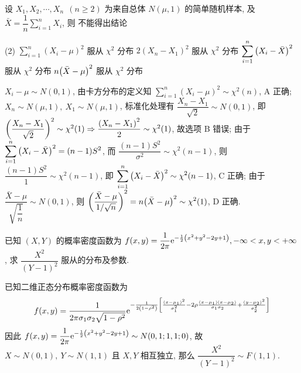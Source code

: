 \begin{example}
    设 $X_1,X_2,\cdots,X_n~~(n\geqslant 2)$ 为来自总体 $N(\mu,1)$ 的简单随机样本, 及 $\bar{X}=\dfrac{1}{n}\displaystyle\sum_{i=1}^{n}X_i$, 则 不能得出结论
    \begin{tasks}(2)
        \task $\displaystyle \sum_{i=1}^{n}(X_i-\mu)^2$ 服从 $\chi^2$ 分布
        \task $\displaystyle 2(X_n-X_1)^2$ 服从 $\chi^2$ 分布
        \task $\displaystyle \sum_{i=1}^{n}\qty(X_i-\bar{X})^2$ 服从 $\chi^2$ 分布
        \task $\displaystyle n\qty(\bar{X}-\mu)^2$ 服从 $\chi^2$ 分布
    \end{tasks}
\end{example}
\begin{solution}
    $X_i-\mu\sim N(0,1)$, 由卡方分布的定义知 $\displaystyle\sum_{i=1}^{n}(X_i-\mu)^2\sim \chi^2(n)$, A 正确;
    $X_n\sim N(\mu,1),~X_1\sim N(\mu,1)$, 标准化处理有 $\dfrac{X_n-X_1}{\sqrt{2}}\sim N(0,1)$, 即 $\qty(\dfrac{X_n-X_1}{\sqrt{2}})^2\sim \chi^2(1)\Rightarrow \dfrac{\qty(X_n-X_1)^2}{2}\sim \chi^2(1)$, 故选项 B 错误;
    由于 $\displaystyle \sum_{i=1}^{n}\qty(X_i-\bar{X})^2=(n-1)S^2$, 而 $\dfrac{(n-1)S^2}{\sigma^2}\sim \chi^2(n-1)$, 则 $\dfrac{(n-1)S^2}{1}\sim \chi^2(n-1)$, 即 $\displaystyle \sum_{i=1}^{n}\qty(X_i-\bar{X})^2\sim \chi^2(n-1)$, C 正确;
    由于 $\dfrac{\bar{X}-\mu}{\sqrt{\dfrac{1}{n}}}\sim N(0,1)$, 则 $\displaystyle\qty(\dfrac{\bar{X}-\mu}{1/ \sqrt{n}})^2=n\qty(\bar{X}-\mu)^2\sim \chi^2(1)$, D 正确.
\end{solution}

\begin{example}
    已知 $(X,Y)$ 的概率密度函数为 $\displaystyle f(x,y)=\dfrac{1}{2\pi}\mathrm{e}^{-\frac{1}{2}\qty(x^2+y^2-2y+1)},-\infty<x,y<+\infty$, 求 $\dfrac{X^2}{(Y-1)^2}$ 服从的分布及参数.
\end{example}
\begin{solution}
    已知二维正态分布概率密度函数为 $$f(x,y)=\dfrac{1}{2\pi\sigma_1\sigma_2\sqrt{1-\rho^2}}\mathrm{e}^{-\frac{1}{2\qty(1-\rho^2)}\qty[\frac{(x-\mu_1)^2}{\sigma_1^2}-2\rho\frac{(x-\mu_1)(x-\mu_2)}{\sigma_1\sigma_2}+\frac{(y-\mu_2)^2}{\sigma_2^2}]}$$
    因此 $f(x,y)=\dfrac{1}{2\pi}\mathrm{e}^{-\frac{1}{2}\qty(x^2+y^2-2y+1)}\sim N(0,1;1,1;0)$, 故 $X\sim N(0,1),~Y\sim N(1,1)$ 且 $X,Y$ 相互独立, 那么 $\dfrac{X^2}{(Y-1)^2}\sim F(1,1).$
\end{solution}

